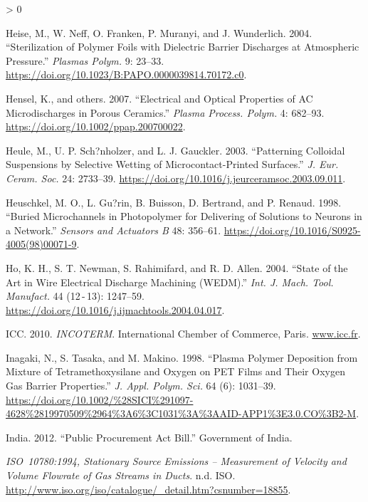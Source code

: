 \documentclass[
  10pt,
  twoside]{article}
\newlength{\cslhangindent}
\newenvironment{CSLReferences}[2] %
 {%
  \setlength{\parindent}{0pt}
  \ifodd #1 \everypar{\setlength{\hangindent}{\cslhangindent}}\ignorespaces\fi
  \ifnum #2 > 0
  \setlength{\parskip}{#2\baselineskip}
  \fi
 }%
 {}
\begin{document}
\begin{CSLReferences}{1}{0}
\leavevmode\hypertarget{ref-Hei04}{}%
Heise, M., W. Neff, O. Franken, P. Muranyi, and J. Wunderlich. 2004. {``Sterilization of Polymer Foils with Dielectric Barrier Discharges at Atmospheric Pressure.''} \emph{Plasmas Polym.} 9: 23--33. \url{https://doi.org/10.1023/B:PAPO.0000039814.70172.c0}.

\leavevmode\hypertarget{ref-Hens07}{}%
Hensel, K., and others. 2007. {``Electrical and Optical Properties of {AC} Microdischarges in Porous Ceramics.''} \emph{Plasma Process. Polym.} 4: 682--93. \url{https://doi.org/10.1002/ppap.200700022}.

\leavevmode\hypertarget{ref-Heul04}{}%
Heule, M., U. P. Sch?nholzer, and L. J. Gauckler. 2003. {``Patterning Colloidal Suspensions by Selective Wetting of Microcontact-Printed Surfaces.''} \emph{J. Eur. Ceram. Soc.} 24: 2733--39. \url{https://doi.org/10.1016/j.jeurceramsoc.2003.09.011}.

\leavevmode\hypertarget{ref-Heusch1998}{}%
Heuschkel, M. O., L. Gu?rin, B. Buisson, D. Bertrand, and P. Renaud. 1998. {``Buried Microchannels in Photopolymer for Delivering of Solutions to Neurons in a Network.''} \emph{Sensors and Actuators B} 48: 356--61. \url{https://doi.org/10.1016/S0925-4005(98)00071-9}.

\leavevmode\hypertarget{ref-Ho04}{}%
Ho, K. H., S. T. Newman, S. Rahimifard, and R. D. Allen. 2004. {``State of the Art in Wire Electrical Discharge Machining {(WEDM)}.''} \emph{Int. J. Mach. Tool. Manufact.} 44 (12 - 13): 1247--59. \url{https://doi.org/10.1016/j.ijmachtools.2004.04.017}.

\leavevmode\hypertarget{ref-incoterm2010}{}%
ICC. 2010. \emph{INCOTERM}. International Chember of Commerce, Paris. \href{https://www.icc.fr}{www.icc.fr}.

\leavevmode\hypertarget{ref-Inag1998}{}%
Inagaki, N., S. Tasaka, and M. Makino. 1998. {``Plasma Polymer Deposition from Mixture of Tetramethoxysilane and Oxygen on {PET} Films and Their Oxygen Gas Barrier Properties.''} \emph{J. Appl. Polym. Sci.} 64 (6): 1031--39. \url{https://doi.org/10.1002/\%28SICI\%291097-4628\%2819970509\%2964\%3A6\%3C1031\%3A\%3AAID-APP1\%3E3.0.CO\%3B2-M}.

\leavevmode\hypertarget{ref-publicprocurementact}{}%
India. 2012. {``Public Procurement Act Bill.''} Government of India.

\leavevmode\hypertarget{ref-ISO10780}{}%
\emph{{ISO}~10780:1994, Stationary Source Emissions -- Measurement of Velocity and Volume Flowrate of Gas Streams in Ducts}. n.d. ISO. \url{http://www.iso.org/iso/catalogue/_detail.htm?csnumber=18855}.


\end{CSLReferences}
\end{document}
